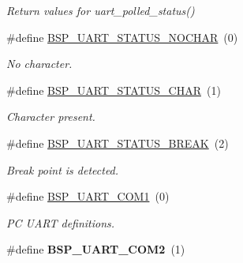 \begin{DoxyCompactItemize}
\begin{DoxyCompactList}\small\item\em Return values for uart\+\_\+polled\+\_\+status() \end{DoxyCompactList}\item 
\mbox{\label{group__i386__uart_gaa5b911a12e47443cf6bf57469df1afc2}} 
\#define \mbox{\hyperlink{group__i386__uart_gaa5b911a12e47443cf6bf57469df1afc2}{B\+S\+P\+\_\+\+U\+A\+R\+T\+\_\+\+S\+T\+A\+T\+U\+S\+\_\+\+N\+O\+C\+H\+AR}}~(0)
\begin{DoxyCompactList}\small\item\em No character. \end{DoxyCompactList}\item 
\mbox{\label{group__i386__uart_ga197291c1f4f6794281ff4faad267b2ea}} 
\#define \mbox{\hyperlink{group__i386__uart_ga197291c1f4f6794281ff4faad267b2ea}{B\+S\+P\+\_\+\+U\+A\+R\+T\+\_\+\+S\+T\+A\+T\+U\+S\+\_\+\+C\+H\+AR}}~(1)
\begin{DoxyCompactList}\small\item\em Character present. \end{DoxyCompactList}\item 
\mbox{\label{group__i386__uart_ga3091ac5c41f3ead06fedf39d5aae71d4}} 
\#define \mbox{\hyperlink{group__i386__uart_ga3091ac5c41f3ead06fedf39d5aae71d4}{B\+S\+P\+\_\+\+U\+A\+R\+T\+\_\+\+S\+T\+A\+T\+U\+S\+\_\+\+B\+R\+E\+AK}}~(2)
\begin{DoxyCompactList}\small\item\em Break point is detected. \end{DoxyCompactList}\item 
\mbox{\label{group__i386__uart_gaa1561064cc8499388f7512347b434d25}} 
\#define \mbox{\hyperlink{group__i386__uart_gaa1561064cc8499388f7512347b434d25}{B\+S\+P\+\_\+\+U\+A\+R\+T\+\_\+\+C\+O\+M1}}~(0)
\begin{DoxyCompactList}\small\item\em PC U\+A\+RT definitions. \end{DoxyCompactList}\item 
\mbox{\label{group__i386__uart_ga11624236c7924ffdda07e5de85149b7f}} 
\#define {\bfseries B\+S\+P\+\_\+\+U\+A\+R\+T\+\_\+\+C\+O\+M2}~(1)
\item 

\end{DoxyCompactItemize}
